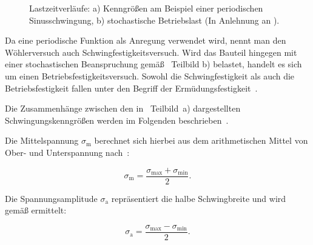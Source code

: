 \begin{figure}[H]
\caption{Lastzeitverläufe: a) Kenngrößen am Beispiel einer periodischen Sinusschwingung, b) stochastische Betriebslast (In Anlehnung an \cite[Seite 269--270]{Werkstofftechnik-Praktikum2021}).}
\label{fig:Lastzeitverlaeufe}
\end{figure}

Da eine periodische Funktion als Anregung verwendet wird, nennt man den Wöhlerversuch auch Schwingfestigkeitsversuch. Wird das Bauteil hingegen mit einer stochastischen Beanspruchung gemäß ~Teilbild b) belastet, handelt es sich um einen Betriebsfestigkeitsversuch. Sowohl die Schwingfestigkeit als auch die Betriebsfestigkeit fallen unter den Begriff der Ermüdungsfestigkeit~\cite[Seite~250]{Laepple2016}. 

Die Zusammenhänge zwischen den in ~Teilbild~a) dargestellten Schwingungskenngrößen werden im Folgenden beschrieben~\cite[Seite~270]{Werkstofftechnik-Praktikum2021}.

Die Mittelspannung $\sigma_{\text{m}}$ berechnet sich hierbei aus dem arithmetischen Mittel von Ober- und Unterspannung nach~:

\begin{equation}\label{eq:Mittelspannung}
\sigma_{\text{m}} = \frac{\sigma_{\text{max}} + \sigma_{\text{min}}}{2}.
\end{equation}

Die Spannungsamplitude $\sigma_{\text{a}}$ repräsentiert die halbe Schwingbreite und wird gemäß  ermittelt:

\begin{equation}\label{eq:Spannungsamplitude}
\sigma_{\text{a}} = \frac{\sigma_{\text{max}} - \sigma_{\text{min}}}{2}.
\end{equation}

